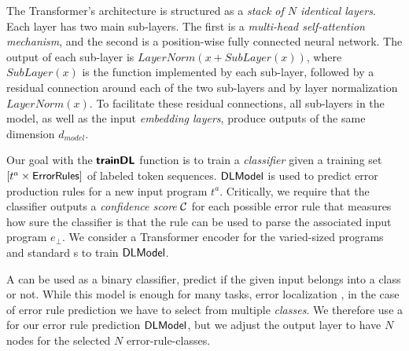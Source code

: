 The Transformer's architecture is structured as a \emph{stack of $N$ identical
layers}. Each layer has two main sub-layers. The first is a \emph{multi-head
self-attention mechanism}, and the second is a position-wise fully connected
neural network. The output of each sub-layer is $LayerNorm(x + SubLayer(x))$,
where $SubLayer(x)$ is the function implemented by each sub-layer, followed by a
residual connection around each of the two sub-layers and  by layer
normalization $LayerNorm(x)$. To facilitate these residual connections, all
sub-layers in the model, as well as the input \emph{embedding layers}, produce
outputs of the same dimension $d_{model}$.



Our goal with the $\bm{\mathsf{trainDL}}$ function is to train a \emph{classifier} given a
training set $[t^a \times \mathsf{ErrorRules}]$ of labeled token sequences.
$\mathsf{DLModel}$ is used to predict error production rules for a new input program
$t^a$. Critically, we require that the classifier outputs a \emph{confidence
score} $\mathcal{C}$ for each possible error rule that measures how sure the
classifier is that the rule can be used to parse the associated input program
$e_{\bot}$. We consider a Transformer encoder for the varied-sized programs and
standard \dnn{}s to train $\mathsf{DLModel}$.

%
A \dnn can be used as a binary classifier, \ie predict if the given input
belongs into a class or not. While this model is enough for many tasks, \eg
error localization \citep{Sakkas_2020, Seidel:2017}, in the case of error rule
prediction we have to select from multiple \emph{classes}. We therefore use a
\dnn for our error rule prediction $\mathsf{DLModel}$, but we adjust the output layer to
have $N$ nodes for the selected $N$ error-rule-classes.


